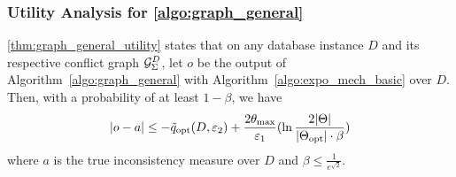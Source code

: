 \subsubsection{Utility Analysis for \cref{algo:graph_general}}\label{app:graph_general_utility}
\cref{thm:graph_general_utility} states that on any database instance $D$ and its respective conflict graph ${\mathcal{G}_{{\Sigma}}^{D}}$, let $o$ be the output of Algorithm~\ref{algo:graph_general} with Algorithm~\ref{algo:expo_mech_basic} over $D$.  
Then,  with a probability of at least $1-\beta$, we have 
\begin{equation}
|o-a| \leq -\tilde{q}_{\normalfont{\text{opt}}}(D,\varepsilon_2) + \frac{2 \theta_{\max}}{\varepsilon_1} (\ln \frac{2|\Theta|}{|\Theta_{\normalfont{\text{opt}}}|\cdot \beta}) 
\end{equation}
where $a$ is the true inconsistency measure over $D$ and $\beta\leq \frac{1}{e^{\sqrt{2}}}$.


